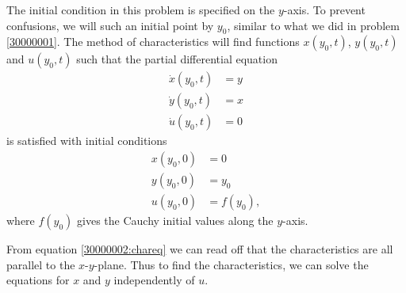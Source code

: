 \begin{loesung}
The initial condition in this problem is specified on the $y$-axis.
To prevent confusions, we will such an initial point by $y_0$, similar
to what we did in problem \ref{30000001}.
The method of characteristics will find functions $x(y_0,t)$,
$y(y_0,t)$ and $u(y_0,t)$ such that the partial differential equation
\begin{equation}
\begin{aligned}
\dot x(y_0, t)&=y\\
\dot y(y_0, t)&=x\\
\dot u(y_0, t)&=0
\end{aligned}
\label{30000002:chareq}
\end{equation}
is satisfied with initial conditions
\begin{align*}
x(y_0, 0)&=0\\
y(y_0, 0)&=y_0\\
u(y_0, 0)&=f(y_0),
\end{align*}
where $f(y_0)$ gives the Cauchy initial values along the $y$-axis.
\begin{teilaufgaben}
\item
From equation \eqref{30000002:chareq} we can read off that the characteristics
are all parallel to the $x$-$y$-plane.
Thus to find the characteristics, we can solve the equations for $x$ and $y$
independently of $u$.


\end{teilaufgaben}
\end{loesung}

